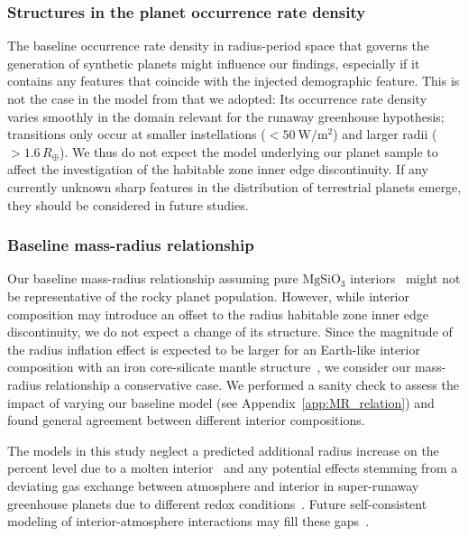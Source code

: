 \documentclass[twocolumn,twocolappendix]{aastex631}
\begin{document}
\subsubsection{Structures in the planet occurrence rate density}
The baseline occurrence rate density in radius-period space that governs the generation of synthetic planets might influence our findings, especially if it contains any features that coincide with the injected demographic feature.
This is not the case in the model from \citet{Bergsten2022} that we adopted: Its occurrence rate density varies smoothly in the domain relevant for the runaway greenhouse hypothesis; transitions only occur at smaller instellations ($< \SI{50}{\watt\per\meter\squared}$) and larger radii ($> 1.6\,R_\oplus$).
We thus do not expect the model underlying our planet sample to affect the investigation of the habitable zone inner edge discontinuity.
If any currently unknown sharp features in the distribution of terrestrial planets emerge, they should be considered in future studies.

\subsubsection{Baseline mass-radius relationship}
Our baseline mass-radius relationship assuming pure $\mathrm{MgSiO_3}$ interiors~\citep{Zeng2016} might not be representative of the rocky planet population.
However, while interior composition may introduce an offset to the radius habitable zone inner edge discontinuity, we do not expect a change of its structure.
Since the magnitude of the radius inflation effect is expected to be larger for an Earth-like interior composition with an iron core-silicate mantle structure~\citep{Zeng2016,2021JGRE..12606724B},
we consider our mass-radius relationship a conservative case.
We performed a sanity check to assess the impact of varying our baseline model (see Appendix~\ref{app:MR_relation}) and found general agreement between different interior compositions.

The models in this study neglect a predicted additional radius increase on the percent level due to a molten interior~\citep{Bower2019} and any potential effects stemming from a deviating gas exchange between atmosphere and interior in super-runaway greenhouse planets due to different redox conditions~\citep{Ikoma2018,2021JGRE..12606711L,2022PSJ.....3...93B,2021SSRv..217...22G}.
Future self-consistent modeling of interior-atmosphere interactions may fill these gaps~\citep{2022arXiv220310023L,Wordsworth2022}.
\end{document}
